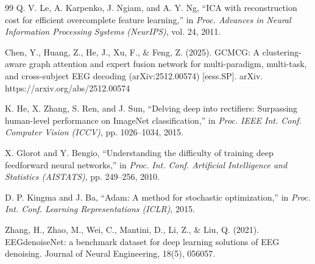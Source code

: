 \documentclass{article}
\begin{document}
\begin{thebibliography}{99}
Q. V. Le, A. Karpenko, J. Ngiam, and A. Y. Ng, ``ICA with reconstruction cost for efficient overcomplete feature learning,'' in \textit{Proc. Advances in Neural Information Processing Systems (NeurIPS)}, vol. 24, 2011.

Chen, Y., Huang, Z., He, J., Xu, F., $\&$ Feng, Z. (2025). GCMCG: A clustering-aware graph attention and expert fusion network for multi-paradigm, multi-task, and cross-subject EEG decoding (arXiv:2512.00574) [eess.SP]. arXiv. https://arxiv.org/abs/2512.00574

K. He, X. Zhang, S. Ren, and J. Sun, ``Delving deep into rectifiers: Surpassing human-level performance on ImageNet classification,'' in \textit{Proc. IEEE Int. Conf. Computer Vision (ICCV)}, pp. 1026--1034, 2015.

X. Glorot and Y. Bengio, ``Understanding the difficulty of training deep feedforward neural networks,'' in \textit{Proc. Int. Conf. Artificial Intelligence and Statistics (AISTATS)}, pp. 249--256, 2010.

D. P. Kingma and J. Ba, ``Adam: A method for stochastic optimization,'' in \textit{Proc. Int. Conf. Learning Representations (ICLR)}, 2015.

Zhang, H., Zhao, M., Wei, C., Mantini, D., Li, Z., $\&$ Liu, Q. (2021). EEGdenoiseNet: a benchmark dataset for deep learning solutions of EEG denoising. Journal of Neural Engineering, 18(5), 056057.

\end{thebibliography}
\end{document}

